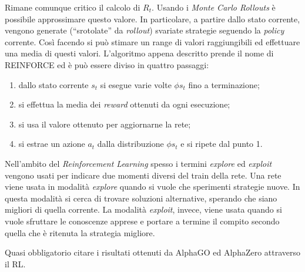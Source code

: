 Rimane comunque critico il calcolo di $R_t$.
Usando i \emph{Monte Carlo Rollouts} è possibile approssimare questo valore.
In particolare, a partire dallo stato corrente, vengono generate (``srotolate'' da \emph{rollout}) svariate strategie seguendo la \emph{policy} corrente.
Così facendo si può stimare un range di valori raggiungibili ed effettuare una media di questi valori.
L'algoritmo appena descritto prende il nome di REINFORCE ed è può essere diviso in quattro passaggi:
\begin{enumerate}
  \item dallo stato corrente $s_t$ si esegue varie volte $\phi{s_t}$ fino a terminazione;
  \item si effettua la media dei \emph{reward} ottenuti da ogni esecuzione;
  \item si usa il valore ottenuto per aggiornarne la rete;
  \item si estrae un azione $a_t$ dalla distribuzione $\phi{s_t}$ e si ripete dal punto 1.
\end{enumerate}
Nell'ambito del \emph{Reinforcement Learning} spesso i termini \emph{explore} ed \emph{exploit} vengono usati per indicare due momenti diversi del train della rete.
Una rete viene usata in modalità \emph{explore} quando si vuole che sperimenti strategie nuove.
In questa modalità si cerca di trovare soluzioni alternative, sperando che siano migliori di quella corrente.
La modalità \emph{exploit}, invece, viene usata quando si vuole sfruttare le conoscenze apprese e portare a termine il compito secondo quella che è ritenuta la strategia migliore.

Quasi obbligatorio citare i risultati ottenuti da AlphaGO \cite{AlphaGO} ed AlphaZero \cite{AlphaZero} attraverso il RL.

















